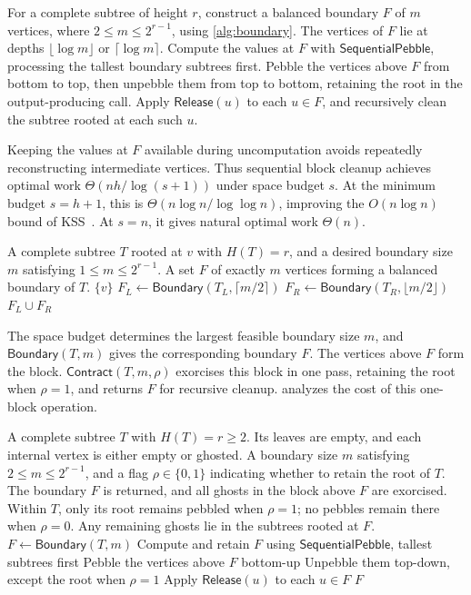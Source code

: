 \documentclass[11pt]{article}
\theoremstyle{definition}
\theoremstyle{remark}
\newcommand{\Fast}{\mathsf{SequentialPebble}}
\newcommand{\Release}{\mathsf{Release}}
\newcommand{\Contract}{\mathsf{Contract}}
\begin{document}
For a complete subtree of height $r$, construct a balanced boundary $F$ of $m$ vertices, where $2\le m\le2^{r-1}$, using \cref{alg:boundary}. The vertices of $F$ lie at depths $\lfloor\log m\rfloor$ or $\lceil\log m\rceil$. Compute the values at $F$ with $\Fast$, processing the tallest boundary subtrees first. Pebble the vertices above $F$ from bottom to top, then unpebble them from top to bottom, retaining the root in the output-producing call. Apply $\Release(u)$ to each $u\in F$, and recursively clean the subtree rooted at each such $u$.

Keeping the values at $F$ available during uncomputation avoids repeatedly reconstructing intermediate vertices. Thus sequential block cleanup achieves optimal work $\Theta(nh/\log(s+1))$ under space budget $s$. At the minimum budget $s=h+1$, this is $\Theta(n\log n/\log\log n)$, improving the $O(n\log n)$ bound of KSS~\cite{KSS2025}. At $s=n$, it gives natural optimal work $\Theta(n)$.

\begin{algorithm}[H]
\caption{Constructing a balanced boundary $\mathsf{Boundary}(T,m)$}
\label{alg:boundary}
\begin{algorithmic}[1]
\Require A complete subtree $T$ rooted at $v$ with $H(T)=r$, and a desired boundary size $m$ satisfying $1\le m\le2^{r-1}$.
\Ensure A set $F$ of exactly $m$ vertices forming a balanced boundary of $T$.
 \State \Return $\{v\}$
\EndIf
\State $F_L\gets\mathsf{Boundary}(T_L,\lceil m/2\rceil)$
\State $F_R\gets\mathsf{Boundary}(T_R,\lfloor m/2\rfloor)$
\State \Return $F_L\cup F_R$
\end{algorithmic}
\end{algorithm}

The space budget determines the largest feasible boundary size $m$, and $\mathsf{Boundary}(T,m)$ gives the corresponding boundary $F$. The vertices above $F$ form the block. $\Contract(T,m,\rho)$ exorcises this block in one pass, retaining the root when $\rho=1$, and returns $F$ for recursive cleanup.  analyzes the cost of this one-block operation.


\begin{algorithm}[H]
\caption{One-block cleanup $\Contract(T,m,\rho)$}
\label{alg:block-contract}
\begin{algorithmic}[1]
\Require A complete subtree $T$ with $H(T)=r\ge2$. Its leaves are empty, and each internal vertex is either empty or ghosted.
\Require A boundary size $m$ satisfying $2\le m\le2^{r-1}$, and a flag $\rho\in\{0,1\}$ indicating whether to retain the root of $T$.
\Ensure The boundary $F$ is returned, and all ghosts in the block above $F$ are exorcised. Within $T$, only its root remains pebbled when $\rho=1$; no pebbles remain there when $\rho=0$. Any remaining ghosts lie in the subtrees rooted at $F$.
\State $F\gets\mathsf{Boundary}(T,m)$
\State Compute and retain $F$ using $\Fast$, tallest subtrees first
\State Pebble the vertices above $F$ bottom-up
\State Unpebble them top-down, except the root when $\rho=1$
\State Apply $\Release(u)$ to each $u\in F$
\State \Return $F$
\end{algorithmic}
\end{algorithm}
\end{document}
